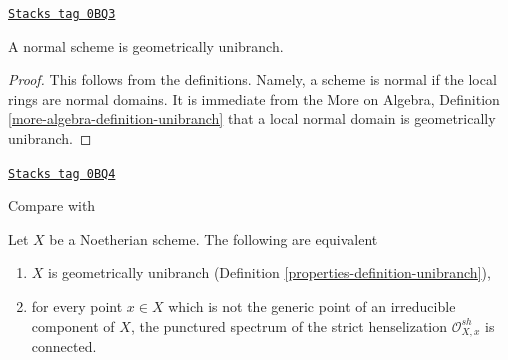 \begin{lemma}
\label{properties-lemma-normal-geometrically-unibranch}
\href{https://stacks.math.columbia.edu/tag/0BQ3}{\texttt{Stacks tag 0BQ3}}

A normal scheme is geometrically unibranch.
\end{lemma}

\begin{proof}
This follows from the definitions. Namely, a scheme
is normal if the local rings are normal domains. It is immediate
from the More on Algebra, Definition \ref{more-algebra-definition-unibranch}
that a local normal domain is geometrically unibranch.
\end{proof}

\begin{lemma}
\label{properties-lemma-geometrically-unibranch}
\href{https://stacks.math.columbia.edu/tag/0BQ4}{\texttt{Stacks tag 0BQ4}}

\begin{reference}
Compare with \cite[Proposition 2.3]{Etale-coverings}
\end{reference}
Let $X$ be a Noetherian scheme. The following are equivalent
\begin{enumerate}
\item $X$ is geometrically unibranch (Definition \ref{properties-definition-unibranch}),
\item for every point $x \in X$ which is not the generic point of
an irreducible component of $X$, the punctured spectrum of the
strict henselization $\mathcal{O}_{X, x}^{sh}$ is connected.
\end{enumerate}
\end{lemma}

